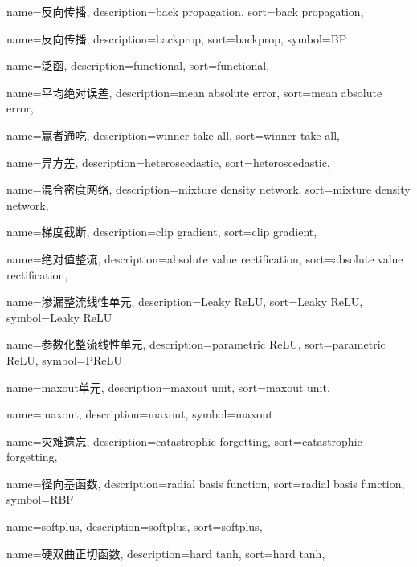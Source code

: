 {
  name=反向传播,
  description={back propagation},
  sort={back propagation},
}

{
  name=反向传播,
  description={backprop},
  sort={backprop},
  symbol={BP}
}

{
  name=泛函,
  description={functional},
  sort={functional},
}

{
  name=平均绝对误差,
  description={mean absolute error},
  sort={mean absolute error},
}

{
  name=赢者通吃,
  description={winner-take-all},
  sort={winner-take-all},
}

{
  name=异方差,
  description={heteroscedastic},
  sort={heteroscedastic},
}

{
  name=混合密度网络,
  description={mixture density network},
  sort={mixture density network},
}

{
  name=梯度截断,
  description={clip gradient},
  sort={clip gradient},
}

{
  name=绝对值整流,
  description={absolute value rectification},
  sort={absolute value rectification},
}

{
  name=渗漏整流线性单元,
  description={Leaky ReLU},
  sort={Leaky ReLU},
  symbol={Leaky ReLU}
}

{
  name=参数化整流线性单元,
  description={parametric ReLU},
  sort={parametric ReLU},
  symbol={PReLU}
}

{
  name=maxout单元,
  description={maxout unit},
  sort={maxout unit},
}

{
  name=maxout,
  description={maxout},
  symbol={maxout}
}

{
  name=灾难遗忘,
  description={catastrophic forgetting},
  sort={catastrophic forgetting},
}

{
  name=径向基函数,
  description={radial basis function},
  sort={radial basis function},
  symbol={RBF}
}

{
  name=softplus,
  description={softplus},
  sort={softplus},
}

{
  name=硬双曲正切函数,
  description={hard tanh},
  sort={hard tanh},
}


